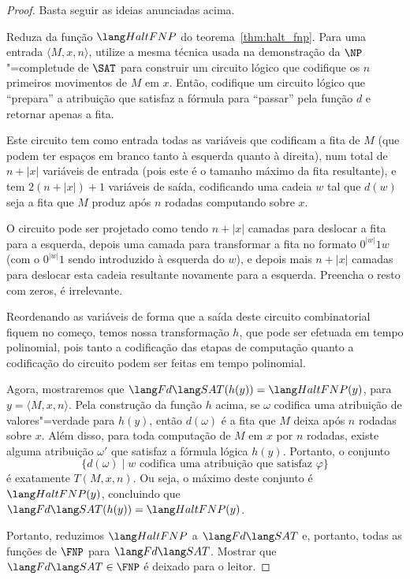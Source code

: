 \begin{proof}
    Basta seguir as ideias anunciadas acima.

    Reduza da função $\HaltFNP$ do teorema~\ref{thm:halt_fnp}.
    Para uma entrada $\langle M, x, n \rangle$,
    utilize a mesma técnica usada na demonstração da $\NP$"=completude de $\SAT$
    para construir um circuito lógico
    que codifique os $n$ primeiros movimentos de $M$ em $x$.
    Então,
    codifique um circuito lógico que ``prepara'' a atribuição que satisfaz a fórmula
    para ``passar'' pela função $d$ e retornar apenas a fita.

    Este circuito tem como entrada todas as variáveis que codificam a fita de $M$
    (que podem ter espaços em branco tanto à esquerda quanto à direita),
    num total de $n + |x|$ variáveis de entrada
    (pois este é o tamanho máximo da fita resultante),
    e tem $2(n + |x|) + 1$ variáveis de saída,
    codificando uma cadeia $w$ tal que
    $d(w)$ seja a fita que $M$ produz após $n$ rodadas computando sobre $x$.

    O circuito pode ser projetado como tendo $n + |x|$ camadas
    para deslocar a fita para a esquerda,
    depois uma camada para transformar a fita no formato $0^{|w|}1w$
    (com o $0^{|w|}1$ sendo introduzido à esquerda do $w$),
    e depois mais $n + |x|$ camadas para deslocar esta cadeia resultante
    novamente para a esquerda.
    Preencha o resto com zeros, é irrelevante.

    Reordenando as variáveis de forma que
    a saída deste circuito combinatorial fiquem no começo,
    temos nossa transformação $h$,
    que pode ser efetuada em tempo polinomial,
    pois tanto a codificação das etapas de computação
    quanto a codificação do circuito podem ser feitas em tempo polinomial.

    Agora, mostraremos que $\FdSAT(h(y)) = \HaltFNP(y)$,
    para $y = \langle M, x, n \rangle$.
    Pela construção da função $h$ acima,
    se $\omega$ codifica uma atribuição de valores"=verdade para $h(y)$,
    então $d(\omega)$ é a fita que $M$ deixa após $n$ rodadas sobre $x$.
    Além disso, para toda computação de $M$ em $x$ por $n$ rodadas,
    existe alguma atribuição $\omega'$ que satisfaz a fórmula lógica $h(y)$.
    Portanto, o conjunto
    \begin{equation*}
        \{d(\omega) \mid \text{$w$ codifica uma atribuição que satisfaz $\varphi$} \}
    \end{equation*}
    é exatamente $T(M, x, n)$.
    Ou seja, o máximo deste conjunto é $\HaltFNP(y)$,
    concluindo que $\FdSAT(h(y)) = \HaltFNP(y)$.

    Portanto, reduzimos $\HaltFNP$ a $\FdSAT$ e,
    portanto,
    todas as funções de $\FNP$ para $\FdSAT$.
    Mostrar que $\FdSAT \in \FNP$ é deixado para o leitor.
\end{proof}

